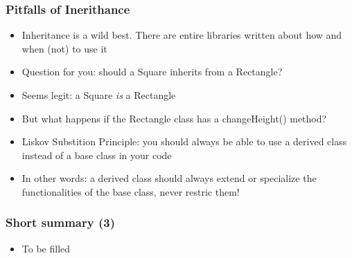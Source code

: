 \documentclass[9pt]{beamer}
\begin{document}
\begin{frame}
  \frametitle{Pitfalls of Inerithance}
    
  \begin{itemize}
    \item Inheritance is a wild best. There are entire libraries written about how and when (not) to use it
    \item Question for you: should a Square inherits from a Rectangle?
    \item Seems legit: a Square \emph{is} a Rectangle
    \item But what happens if the Rectangle class has a changeHeight() method?
    \bigskip
    
    \bigskip
    
    \item \alert{Liskov Substition Principle}: you should always be able to use
          a derived class instead of a base class in your code
    \item In other words: a derived class should always extend or specialize
          the functionalities of the base class, never restric them!
   \end{itemize}
  
\end{frame}



\begin{frame}
  \frametitle{Short summary (3)}
    
  \begin{itemize}
    \item To be filled
   \end{itemize}
  
\end{frame}
\end{document}
